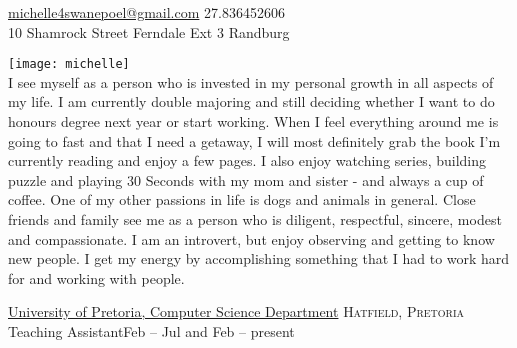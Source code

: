 

\sloppy  %



\nobreakvspace{0.3em}  %

\noindent\href{mailto:michelle4swanepoel.at.gmail.dot.com}{michelle4swanepoel\mbox{}@\mbox{}gmail.com}\sbull
\textsmaller{+}27.836452606\sbull
\\
10 Shamrock Street\sbull
Ferndale Ext 3\sbull
Randburg\sbull

\spacedhrule{0.9em}{-0.4em}  %
\begin{center}
\end{center}


\vspace{-1.3em}  %
\begin{multicols}{3}%

\noindent \texttt{[image: michelle]}\\I see myself as a person who is invested in my personal growth in all aspects of my life. I am currently double majoring and still deciding whether I want to do honours degree next year or start working.  When I feel everything around me is going to fast and that I need a getaway, I will most definitely grab the book I'm currently reading and enjoy a few pages. I also enjoy watching series, building puzzle and playing 30 Seconds with my mom and sister - and always  a cup of coffee. One of my other passions in life is dogs and animals in general. Close friends and family see me as a person who is diligent, respectful, sincere, modest and compassionate. I am an introvert, but enjoy observing and getting to know new people. I get my energy by accomplishing something that I had to work hard for and working with people.


\end{multicols}

\spacedhrule{0em}{-0.4em}


    
\headedsection
  {\href{http://www.up.ac.za}{University of Pretoria, Computer Science Department}}
  {\textsc{Hatfield, Pretoria}} {%
  \headedsubsection
    {Teaching Assistant}{Feb -- Jul and Feb -- present}
    {}
    }
        

